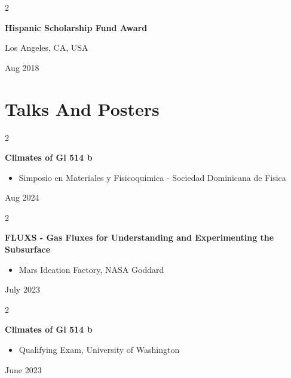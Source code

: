 \documentclass[10pt, letterpaper]{article}
\newenvironment{highlights}{
    \begin{itemize}[
        topsep=0.10 cm,
        parsep=0.10 cm,
        partopsep=0pt,
        itemsep=0pt,
        leftmargin=0.4 cm + 10pt
    ]
}{
    \end{itemize}
} %
\newenvironment{twocolentry}[2][]{
    \onecolentry
    \def\secondColumn{#2}
    \setcolumnwidth{\fill, 4.5 cm}
    \begin{paracol}{2}
}{
    \switchcolumn \raggedleft \secondColumn
    \end{paracol}
    \endonecolentry
} %
\begin{document}
        \vspace{0.2 cm}

        \begin{twocolentry}{
            Los Angeles, CA, USA

        Aug 2018
        }
            \textbf{Hispanic Scholarship Fund Award}
        \end{twocolentry}



    
    \section{Talks And Posters}



        
        \begin{twocolentry}{
            Aug 2024
        }
            \textbf{Climates of Gl 514 b}
            \begin{highlights}
                \item Simposio en Materiales y Fisicoquimica - Sociedad Dominicana de Fisica
            \end{highlights}
        \end{twocolentry}


        \vspace{0.2 cm}

        \begin{twocolentry}{
            July 2023
        }
            \textbf{FLUXS - Gas Fluxes for Understanding and Experimenting the Subsurface}
            \begin{highlights}
                \item Mars Ideation Factory, NASA Goddard
            \end{highlights}
        \end{twocolentry}


        \vspace{0.2 cm}

        \begin{twocolentry}{
            June 2023
        }
            \textbf{Climates of Gl 514 b}
            \begin{highlights}
                \item Qualifying Exam, University of Washington
            \end{highlights}
        \end{twocolentry}


        \vspace{0.2 cm}
\end{document}
